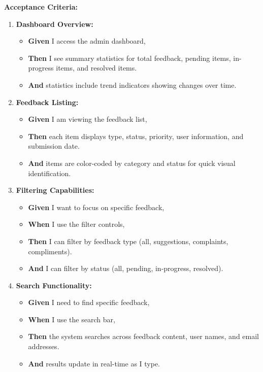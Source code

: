 \documentclass[12pt]{article}
\begin{document}
\vspace{1em}
\textbf{Acceptance Criteria:}
\begin{enumerate}
    \item \textbf{Dashboard Overview:}
    \begin{itemize}
        \item \textbf{Given} I access the admin dashboard,
        \item \textbf{Then} I see summary statistics for total feedback, pending items, in-progress items, and resolved items.
        \item \textbf{And} statistics include trend indicators showing changes over time.
    \end{itemize}

    \item \textbf{Feedback Listing:}
    \begin{itemize}
        \item \textbf{Given} I am viewing the feedback list,
        \item \textbf{Then} each item displays type, status, priority, user information, and submission date.
        \item \textbf{And} items are color-coded by category and status for quick visual identification.
    \end{itemize}

    \item \textbf{Filtering Capabilities:}
    \begin{itemize}
        \item \textbf{Given} I want to focus on specific feedback,
        \item \textbf{When} I use the filter controls,
        \item \textbf{Then} I can filter by feedback type (all, suggestions, complaints, compliments).
        \item \textbf{And} I can filter by status (all, pending, in-progress, resolved).
    \end{itemize}

    \item \textbf{Search Functionality:}
    \begin{itemize}
        \item \textbf{Given} I need to find specific feedback,
        \item \textbf{When} I use the search bar,
        \item \textbf{Then} the system searches across feedback content, user names, and email addresses.
        \item \textbf{And} results update in real-time as I type.
    \end{itemize}


\end{enumerate}
\end{document}
